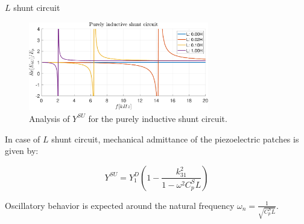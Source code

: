 \begin{frame}{$L$ shunt circuit}

    \begin{figure}[H]
        \centering
        \includegraphics[width=0.7\textwidth]{./img/MATLAB/Y_SU_Purely inductive shunt circuit.pdf}
        \caption{Analysis of $Y^{SU}$ for the purely inductive shunt circuit.}
    \end{figure}

    In case of $L$ shunt circuit, mechanical admittance of the piezoelectric patches is given by:

    \begin{equation}
        Y^{SU} = Y_1^D \left( 1 - \frac{k_{31}^2}{1 -\omega^2 C_p^S L} \right)
    \end{equation}

    Oscillatory behavior is expected around the natural frequency $\omega_n = \frac{1}{\sqrt{C_p^S L}}$.

\end{frame}



